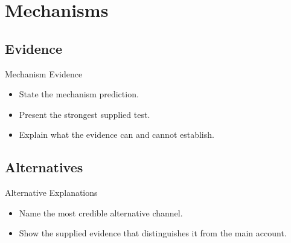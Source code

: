 \section{Mechanisms}
\subsection{Evidence}

\begin{frame}{Mechanism Evidence}
  \begin{itemize}
    \item State the mechanism prediction.
    \item Present the strongest supplied test.
    \item Explain what the evidence can and cannot establish.
  \end{itemize}
\end{frame}

\subsection{Alternatives}

\begin{frame}{Alternative Explanations}
  \begin{itemize}
    \item Name the most credible alternative channel.
    \item Show the supplied evidence that distinguishes it from the main account.
  \end{itemize}
\end{frame}

